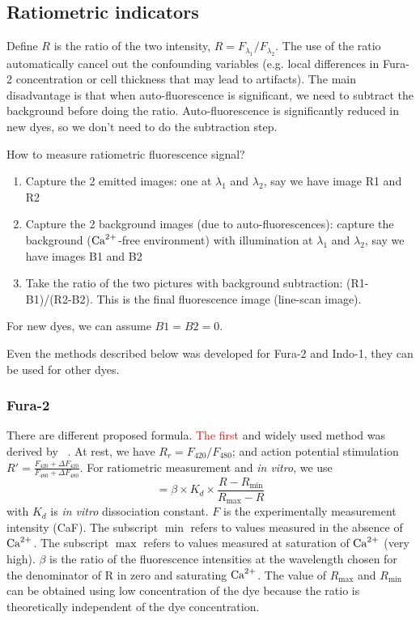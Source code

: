 \subsection{Ratiometric indicators}
\label{sec:calibrate_ratiometric_indicator}

Define $R$ is the ratio of the two intensity, $R=F_{\lambda_1}/F_{\lambda_2}$.
The use of the ratio automatically cancel out the confounding variables (e.g.
local differences in Fura-2 concentration or cell thickness that may lead to
artifacts). The main disadvantage is that when auto-fluorescence is significant,
we need to subtract the background before doing the ratio. Auto-fluorescence is
significantly reduced in new dyes, so we don't need to do the subtraction step.

\begin{framed}
How to measure ratiometric fluorescence signal?
\begin{enumerate}
  \item Capture the 2 emitted images: one at $\lambda_1$ and $\lambda_2$, say we
  have image R1 and R2
  \item Capture the 2 background images (due to auto-fluorescences): capture the
  background (${\text{Ca}^{2+}}$-free environment) with illumination at $\lambda_1$ and
  $\lambda_2$, say we have images B1 and B2
  \item Take the ratio of the two pictures with background subtraction:
  (R1-B1)/(R2-B2). This is the final fluorescence image (line-scan image).
\end{enumerate}
For new dyes, we can assume $B1=B2=0$.
\end{framed}

Even the methods described below was developed for Fura-2 and Indo-1, they can
be used for other dyes.

\subsubsection{Fura-2}
\label{sec:calibrate_Fura-2}

There are different proposed formula. \textcolor{red}{The first} and widely used
method was derived by ~\citep{grynkiewicz1985}. At rest, we have 
$R_r=F_{420}/F_{480}$; and
action potential stimulation 
$R'=\frac{F_{420}+ \Delta F_{420}}{F_{480}+\Delta F_{480}}$. For ratiometric
measurement and {\it in vitro}, we use
\begin{equation}
[\Ca] = \beta \times K_d \times \frac{R-R_\min}{R_\max-R}
\end{equation}
with $K_d$ is {\it in vitro} dissociation constant. $F$ is the experimentally
measurement intensity (CaF). The subscript $\min$ refers to values measured in
the absence of ${\text{Ca}^{2+}}$. The subscript $\max$ refers to values measured at
saturation of ${\text{Ca}^{2+}}$ (very high). 
$\beta$ is the ratio of the fluorescence intensities at the wavelength chosen
for the denominator of R in zero and saturating ${\text{Ca}^{2+}}$. The value of $R_\max$ and
$R_\min$ can be obtained using low concentration of the dye because the ratio is
theoretically independent of the dye concentration. 



